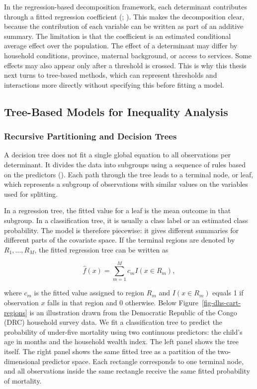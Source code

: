 \documentclass[
  11pt,
  a4paper,
]{article}
\begin{document}
In the regression-based decomposition framework, each determinant
contributes through a fitted regression coefficient
(; ). This makes the decomposition clear, because the
contribution of each variable can be written as part of an additive
summary. The limitation is that the coefficient is an estimated
conditional average effect over the population. The effect of a
determinant may differ by household conditions, province, maternal
background, or access to services. Some effects may also appear only
after a threshold is crossed. This is why this thesis next turns to
tree-based methods, which can represent thresholds and interactions more
directly without specifying this before fitting a model.

\subsection{Tree-Based Models for Inequality
Analysis}\label{sec-tree-based-models}

\subsubsection{Recursive Partitioning and Decision
Trees}\label{sec-recursive-partitioning-decision-trees}

A decision tree does not fit a single global equation to all
observations per determinant. It divides the data into subgroups using a
sequence of rules based on the predictors
(). Each path through the tree leads to a terminal node, or leaf,
which represents a subgroup of observations with similar values on the
variables used for splitting.

In a regression tree, the fitted value for a leaf is the mean outcome in
that subgroup. In a classification tree, it is usually a class label or
an estimated class probability. The model is therefore piecewise: it
gives different summaries for different parts of the covariate space. If
the terminal regions are denoted by \(R_1,\dots,R_M\), the fitted
regression tree can be written as

\[
\hat{f}(x) = \sum_{m=1}^{M} c_m I(x \in R_m),
\]

where \(c_m\) is the fitted value assigned to region \(R_m\) and
\(I(x \in R_m)\) equals 1 if observation \(x\) falls in that region and
0 otherwise. Below Figure~\ref{fig-dhs-cart-regions} is an illustration
drawn from the Democratic Republic of the Congo (DRC) household survey
data. We fit a classification tree to predict the probability of
under-five mortality using two continuous predictors: the child's age in
months and the household wealth index. The left panel shows the tree
itself. The right panel shows the same fitted tree as a partition of the
two-dimensional predictor space. Each rectangle corresponds to one
terminal node, and all observations inside the same rectangle receive
the same fitted probability of mortality.
\end{document}
